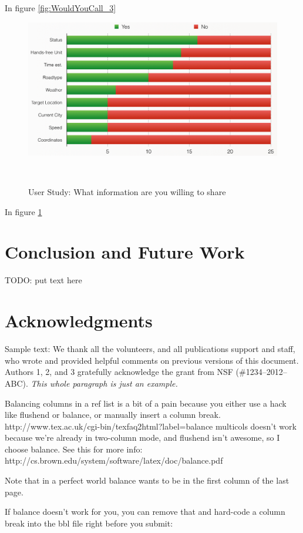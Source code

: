 \documentclass{sigchi}
\begin{document}
In figure \ref{fig:WouldYouCall_3}

\begin{figure}
\centering
  \includegraphics[width=0.9\columnwidth]{figures/WhatAreYouWillingToShare}
  \caption{User Study: What information are you willing to share}~\label{fig:WhatAreYouWillingToShare}
\end{figure}

In figure \ref{fig:WhatAreYouWillingToShare}


\section{Conclusion and Future Work}

TODO: put text here

\section{Acknowledgments}

Sample text: We thank all the volunteers, and all publications support
and staff, who wrote and provided helpful comments on previous
versions of this document. Authors 1, 2, and 3 gratefully acknowledge
the grant from NSF (\#1234--2012--ABC). \textit{This whole paragraph is
  just an example.}

 Balancing columns in a ref list is a bit of a pain because you
 either use a hack like flushend or balance, or manually insert
 a column break.  http://www.tex.ac.uk/cgi-bin/texfaq2html?label=balance
 multicols doesn't work because we're already in two-column mode,
 and flushend isn't awesome, so I choose balance.  See this
 for more info: http://cs.brown.edu/system/software/latex/doc/balance.pdf

 Note that in a perfect world balance wants to be in the first
 column of the last page.

 If balance doesn't work for you, you can remove that and
 hard-code a column break into the bbl file right before you
 submit:
\end{document}
